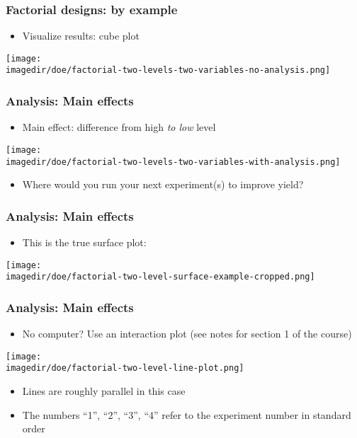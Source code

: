 \begin{frame}\frametitle{Factorial designs: by example}
	\begin{itemize}
		\item	Visualize results: cube plot
	\end{itemize}
	
	\vspace{12pt}
	\begin{center}
		\texttt{[image: \\imagedir/doe/factorial-two-levels-two-variables-no-analysis.png]}
	\end{center}
\end{frame}

\begin{frame}\frametitle{Analysis: Main effects}
	\begin{itemize}
		\item	Main effect: difference {\color{red}from high} {\color{orange}\emph{to low}} level
	\end{itemize}
	\begin{center}
		\texttt{[image: \\imagedir/doe/factorial-two-levels-two-variables-with-analysis.png]}
	\end{center}
	\begin{itemize}
		\item	Where would you run your next experiment(s) to improve yield?
	\end{itemize}
\end{frame}

\begin{frame}\frametitle{Analysis: Main effects}
	\begin{itemize}
		\item	This is the true surface plot:
	\end{itemize}
	\begin{center}
		\texttt{[image: \\imagedir/doe/factorial-two-level-surface-example-cropped.png]}
	\end{center}
\end{frame}

\begin{frame}\frametitle{Analysis: Main effects}
	\begin{itemize}
		\item	No computer? Use an interaction plot {\scriptsize (see notes for section 1 of the course)}
	\end{itemize}
	\begin{center}
		\texttt{[image: \\imagedir/doe/factorial-two-level-line-plot.png]}
	\end{center}
	\begin{itemize}
		\item	Lines are roughly parallel in this case
		\item	The numbers ``1'', ``2'', ``3'', ``4'' refer to the experiment number in standard order
	\end{itemize}
\end{frame}

